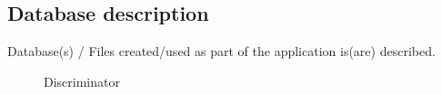 \documentclass[oneside,a4paper,12pt]{report}
\begin{document}
\subsection{Database description}
Database(s) / Files created/used  as part of the application is(are) described.

  \begin{center}
	\begin{figure}[!htbp]
		\centering
	  \caption{Discriminator}
	  \label{fig:disc_color-dig}
	\end{figure}
  \end{center}
\end{document}
